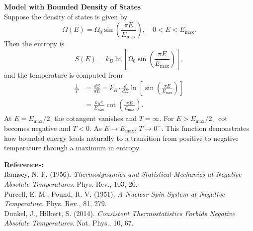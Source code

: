 \begin{technical}
\noindent\textbf{Model with Bounded Density of States}\\[0.5em]
Suppose the density of states is given by
\[
\Omega(E) = \Omega_0 \sin \left( \frac{\pi E}{E_\text{max}} \right), \quad 0 < E < E_\text{max}.
\]
Then the entropy is
\[
S(E) = k_B \ln \left[ \Omega_0 \sin \left( \frac{\pi E}{E_\text{max}} \right) \right],
\]
and the temperature is computed from
\begin{align}
\frac{1}{T} &= \frac{dS}{dE} = k_B \cdot \frac{d}{dE} \ln \left[ \sin \left( \frac{\pi E}{E_\text{max}} \right) \right] \\
           &= \frac{k_B \pi}{E_\text{max}} \cot \left( \frac{\pi E}{E_\text{max}} \right).
\end{align}
At \( E = E_\text{max}/2 \), the cotangent vanishes and \( T = \infty \). For \( E > E_\text{max}/2 \), \( \cot \) becomes negative and \( T < 0 \). As \( E \to E_\text{max} \), \( T \to 0^- \). This function demonstrates how bounded energy leads naturally to a transition from positive to negative temperature through a maximum in entropy.

\noindent\textbf{References:}\\
Ramsey, N. F. (1956). \textit{Thermodynamics and Statistical Mechanics at Negative Absolute Temperatures}. Phys. Rev., 103, 20.\\
Purcell, E. M., Pound, R. V. (1951). \textit{A Nuclear Spin System at Negative Temperature}. Phys. Rev., 81, 279.\\
Dunkel, J., Hilbert, S. (2014). \textit{Consistent Thermostatistics Forbids Negative Absolute Temperatures}. Nat. Phys., 10, 67.
\end{technical}
